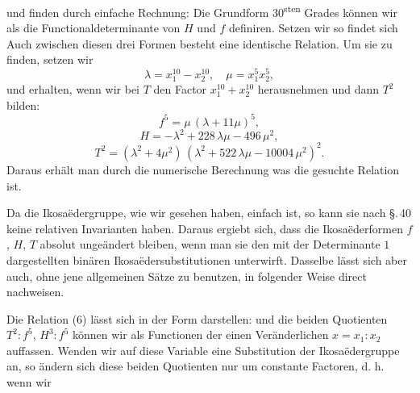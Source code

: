 und finden durch einfache Rechnung:
Die Grundform 30\textsuperscript{sten} Grades können wir als die Functionaldeterminante von $H$ und $f$ definiren. Setzen wir
so findet sich
Auch zwischen diesen drei Formen besteht eine identische Relation. Um sie zu finden, setzen wir
\[
\lambda = x_1^{10} - x_2^{10}, \quad \mu = x_1^5 x_2^5,
\]
und erhalten, wenn wir bei $T$ den Factor $x_1^{10} + x_2^{10}$ herausnehmen und dann $T^2$ bilden:
\[
f^5 = \mu\,(\lambda + 11\mu)^5,
\]
\[
H = -\lambda^2 + 228\,\lambda\mu - 496\,\mu^2,
\]
\[
T^2 = (\lambda^2 + 4\mu^2)\,(\lambda^2 + 522\,\lambda\mu - 10004\,\mu^2)^2.
\]
Daraus erhält man durch die numerische Berechnung
was die gesuchte Relation ist.

Da die Ikosa\"edergruppe, wie wir gesehen haben, einfach ist, so kann sie nach \S.\,40 keine relativen Invarianten haben. Daraus ergiebt sich, dass die Ikosa\"ederformen $f$, $H$, $T$ absolut ungeändert bleiben, wenn man sie den mit der Determinante $1$ dargestellten binären Ikosa\"edersubstitutionen unterwirft. Dasselbe lässt sich aber auch, ohne jene allgemeinen Sätze zu benutzen, in folgender Weise direct nachweisen.

Die Relation (6) lässt sich in der Form darstellen:
und die beiden Quotienten $T^2 : f^5$, $H^3 : f^5$ können wir als Functionen der einen Veränderlichen $x = x_1 : x_2$ auffassen. Wenden wir auf diese Variable eine Substitution der Ikosa\"edergruppe an, so ändern sich diese beiden Quotienten nur um constante Factoren, d. h. wenn wir
